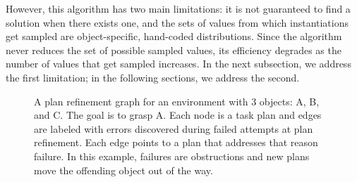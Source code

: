 However, this algorithm has two
main limitations: it is not guaranteed to find a solution when
there exists one, and the sets of values from which instantiations
get sampled are object-specific, hand-coded distributions. Since the algorithm
never reduces the set of possible sampled values, its
efficiency degrades as the number of values that get sampled increases. In the next subsection,
we address the first limitation; in the following sections, we address the second.

\begin{figure}[t]
  \centering
  \caption{\small{A plan refinement graph for an environment with 3
      objects: A, B, and C. The goal is to grasp A. Each node is a
      task plan and edges are labeled with errors discovered during
      failed attempts at plan refinement. Each edge points to a plan
      that addresses that reason failure. In this example, failures
      are obstructions and new plans move the offending object out of
      the way.}}
  \label{fig:prg}
\end{figure}

